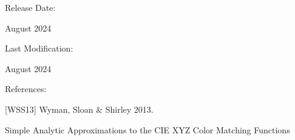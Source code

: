 \documentclass[letterpaper,10pt,english]{sphinxmanual}
\begin{document}
\begin{DUlineblock}{0em}
\item[] Release Date:
\item[] August 2024
\item[] Last Modification:
\item[] August 2024
\end{DUlineblock}

\begin{DUlineblock}{0em}
\item[] References:
\end{DUlineblock}

\begin{DUlineblock}{0em}
\item[] {[}WSS13{]} Wyman, Sloan \& Shirley 2013.
\item[] Simple Analytic Approximations to the CIE XYZ Color Matching Functions
\item[] 
\end{DUlineblock}
\end{document}

